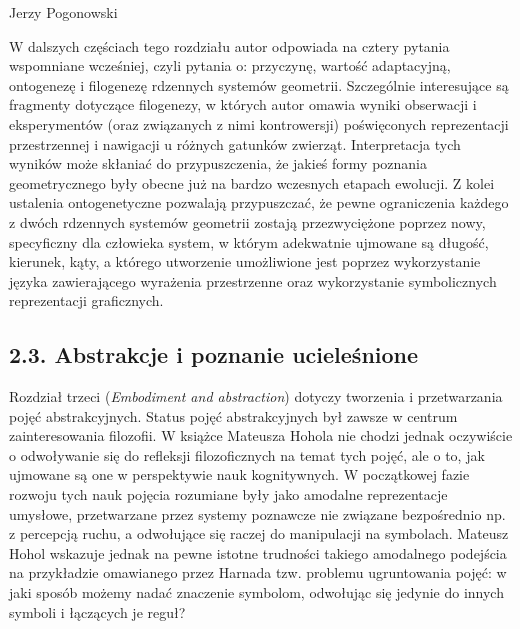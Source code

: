 \begin{newrevengenv}{Jerzy Pogonowski}
\begin{enumerate}
\end{enumerate}

W dalszych częściach tego rozdziału autor odpowiada na cztery
pytania wspomniane wcześniej, czyli pytania o: przyczynę, wartość
adaptacyjną, ontogenezę i filogenezę rdzennych systemów geometrii.
Szczególnie interesujące są fragmenty dotyczące filogenezy, w których
autor omawia wyniki obserwacji i eksperymentów (oraz związanych z
nimi kontrowersji) poświęconych reprezentacji przestrzennej i
nawigacji u różnych gatunków zwierząt. Interpretacja tych wyników
może skłaniać do przypuszczenia, że jakieś formy poznania
geometrycznego były obecne już na bardzo wczesnych etapach
ewolucji. Z kolei ustalenia ontogenetyczne pozwalają przypuszczać,
że pewne ograniczenia każdego z dwóch rdzennych systemów geometrii
zostają przezwyciężone poprzez nowy, specyficzny dla człowieka
system, w którym adekwatnie ujmowane są długość, kierunek, kąty, a
którego utworzenie umożliwione jest poprzez wykorzystanie języka
zawierającego wyrażenia przestrzenne oraz wykorzystanie
symbolicznych reprezentacji graficznych.

\subsection{2.3. Abstrakcje i poznanie ucieleśnione}

Rozdział trzeci ({\em Embodiment and abstraction}) dotyczy
tworzenia i przetwarzania pojęć abstrakcyjnych. Status pojęć
abstrakcyjnych był zawsze w centrum zainteresowania filozofii. W
książce Mateusza Hohola nie chodzi jednak oczywiście o odwoływanie
się do refleksji filozoficznych na temat tych pojęć, ale o to, jak
ujmowane są one w perspektywie nauk kognitywnych. W początkowej
fazie rozwoju tych nauk pojęcia rozumiane były jako amodalne
reprezentacje umysłowe, przetwarzane przez systemy poznawcze nie
związane bezpośrednio np. z percepcją ruchu, a odwołujące się
raczej do manipulacji na symbolach. Mateusz Hohol wskazuje jednak
na pewne istotne trudności takiego amodalnego podejścia na
przykładzie omawianego przez Harnada tzw. problemu ugruntowania
pojęć: w jaki sposób możemy nadać znaczenie symbolom, odwołując
się jedynie do innych symboli i łączących je reguł? 


\end{newrevengenv}
